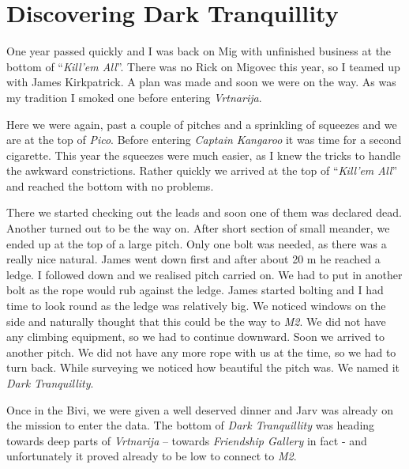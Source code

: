 \section{Discovering Dark
Tranquillity}

One year passed quickly and I was back on Mig with unfinished business
at the bottom of ``\emph{Kill'em All}''. There was no Rick on Migovec
this year, so I teamed up with James Kirkpatrick. A plan was made and
soon we were on the way. As was my tradition I smoked one before
entering \emph{Vrtnarija}.

Here we were again, past a couple of pitches and a sprinkling of
squeezes and we are at the top of \emph{Pico}. Before entering
\emph{Captain Kangaroo} it was time for a second cigarette. This year
the squeezes were much easier, as I knew the tricks to handle the
awkward constrictions. Rather quickly we arrived at the top of
``\emph{Kill'em All}'' and reached the bottom with no problems.

There we started checking out the leads and soon one of them was
declared dead. Another turned out to be the way on. After short section
of small meander, we ended up at the top of a large pitch. Only one bolt
was needed, as there was a really nice natural. James went down first
and after about 20 m he reached a ledge. I followed down and we realised
pitch carried on. We had to put in another bolt as the rope would rub
against the ledge. James started bolting and I had time to look round as
the ledge was relatively big. We noticed windows on the side and
naturally thought that this could be the way to \emph{M2}. We did not
have any climbing equipment, so we had to continue downward. Soon we
arrived to another pitch. We did not have any more rope with us at the
time, so we had to turn back. While surveying we noticed how beautiful
the pitch was. We named it \emph{Dark Tranquillity}.

Once in the Bivi, we were given a well deserved dinner and Jarv was
already on the mission to enter the data. The bottom of \emph{Dark
Tranquillity} was heading towards deep parts of \emph{Vrtnarija} --
towards \emph{Friendship Gallery} in fact - and unfortunately it proved
already to be low to connect to \emph{M2}.

